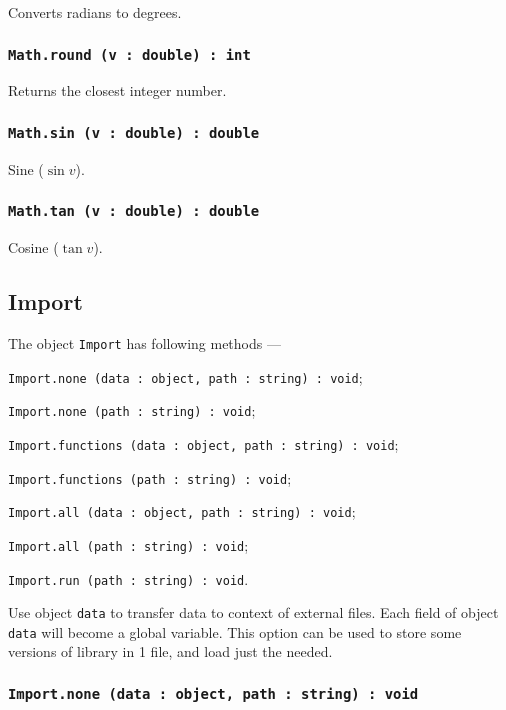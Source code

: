 Converts radians to degrees.

\subsubsection{\texttt{Math.round (v : double) : int}}

Returns the closest integer number.

\subsubsection{\texttt{Math.sin (v : double) : double}}

Sine ($\sin{v}$).

\subsubsection{\texttt{Math.tan (v : double) : double}}

Cosine ($\tan{v}$).

\subsection{Import}

The object \texttt{Import} has following methods —
\begin{icItems}
	\item \texttt{Import.none (data : object, path : string) : void};
	\item \texttt{Import.none (path : string) : void};
	\item \texttt{Import.functions (data : object, path : string) : void};
	\item \texttt{Import.functions (path : string) : void};
	\item \texttt{Import.all (data : object, path : string) : void};
	\item \texttt{Import.all (path : string) : void};
	\item \texttt{Import.run (path : string) : void}.
\end{icItems}

Use object \texttt{data} to transfer data to context of external files. Each field of object \texttt{data} will become a global variable. This option can be used to store some versions of library in 1 file, and load just the needed.

\subsubsection{\texttt{Import.none (data : object, path : string) : void}}

